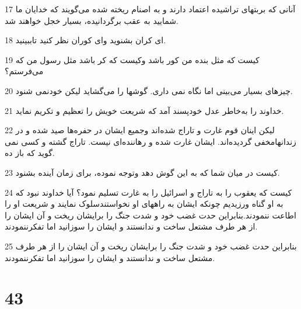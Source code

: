 \par 17 آنانی که بربتهای تراشیده اعتماد دارند و به اصنام ریخته شده می‌گویند که خدایان ما شمایید به عقب برگردانیده، بسیار خجل خواهند شد.
\par 18 ‌ای کران بشنوید و‌ای کوران نظر کنید تاببینید.
\par 19 کیست که مثل بنده من کور باشد وکیست که کر باشد مثل رسول من که می‌فرستم؟
\par 20 چیزهای بسیار می‌بینی اما نگاه نمی داری. گوشها را می‌گشاید لیکن خودنمی شنود.
\par 21 خداوند را به‌خاطر عدل خودپسند آمد که شریعت خویش را تعظیم و تکریم نماید.
\par 22 لیکن اینان قوم غارت و تاراج شده‌اند وجمیع ایشان در حفره‌ها صید شده و در زندانهامخفی گردیده‌اند. ایشان غارت شده و رهاننده‌ای نیست. تاراج گشته و کسی نمی گوید که باز ده.
\par 23 کیست در میان شما که به این گوش دهد وتوجه نموده، برای زمان آینده بشنود.
\par 24 کیست که یعقوب را به تاراج و اسرائیل را به غارت تسلیم نمود؟ آیا خداوند نبود که به او گناه ورزیدیم چونکه ایشان به راههای او نخواستندسلوک نمایند و شریعت او را اطاعت ننمودند.بنابراین حدت غضب خود و شدت جنگ را برایشان ریخت و آن ایشان را از هر طرف مشتعل ساخت و ندانستند و ایشان را سوزانید اما تفکرننمودند.
\par 25 بنابراین حدت غضب خود و شدت جنگ را برایشان ریخت و آن ایشان را از هر طرف مشتعل ساخت و ندانستند و ایشان را سوزانید اما تفکرننمودند.
 
\chapter{43}

